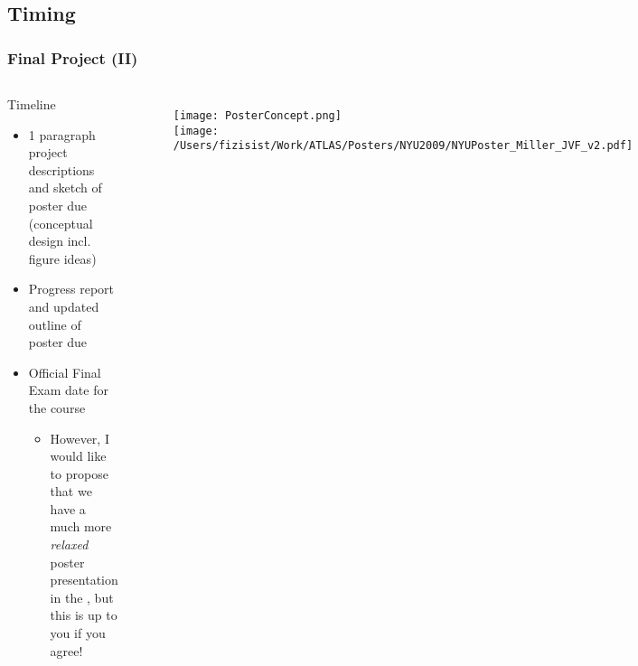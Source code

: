 \documentclass[hyperref={colorlinks=true}]{beamer}
\begin{document}
\subsection[Timing]{Timing}


\begin{frame}%
  \frametitle{Final Project (II)}

  \begin{columns}
  
    
  \begin{ucblock}{Timeline}
    \begin{itemize}
      \item {} 1 paragraph project descriptions and sketch of poster due (conceptual design incl. figure ideas)
      \item {} Progress report and updated outline of poster due
      \item {} Official Final Exam date for the course
      \begin{itemize}
        \item However, I would like to propose that we have a much more \textit{relaxed} poster presentation in the , but this is up to you if you agree!
      \end{itemize}
    \end{itemize}
  \end{ucblock}
  
  
  \vspace{-1cm}
  
  \begin{figure}
    \texttt{[image: PosterConcept.png]}\\
    \texttt{[image: /Users/fizisist/Work/ATLAS/Posters/NYU2009/NYUPoster\_Miller\_JVF\_v2.pdf]}\\
  \end{figure}

  
  \end{columns}

  
\end{frame}
\end{document}
